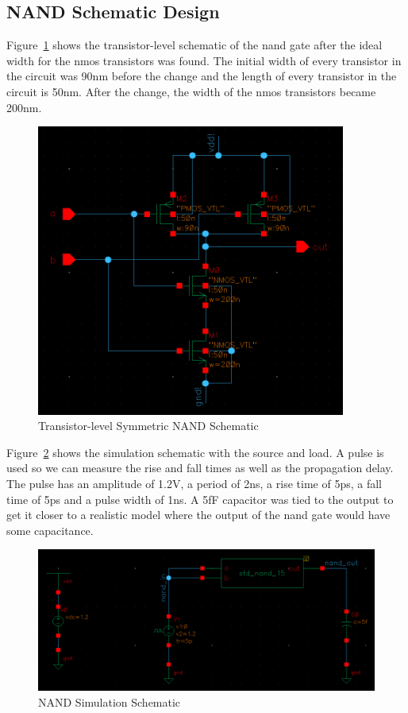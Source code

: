 \documentclass[12pt]{article}
\begin{document}
\subsection{NAND Schematic Design}
Figure~\ref{fig:nand_schem} shows the transistor-level schematic of the nand gate after the ideal width for the nmos transistors was found.
The initial width of every transistor in the circuit was 90nm before the change and the length of every transistor in the circuit is 50nm. After the change, the width of the nmos
transistors became 200nm.
\begin{figure}[!htb]
  \centering
  \includegraphics[width=4in]{figures/nand/nand_schem.png}
  \caption{Transistor-level Symmetric NAND Schematic}\label{fig:nand_schem}
\end{figure}
Figure~\ref{fig:nand_sim} shows the simulation schematic with the source and load. A pulse is used so we can measure the rise and fall times as well as the propagation delay. The
pulse has an amplitude of 1.2V, a period of 2ns, a rise time of 5ps, a fall time of 5ps and a pulse width of 1ns. A 5fF capacitor was tied to the output to get it closer to a
realistic model where the output of the nand gate would have some capacitance.
\begin{figure}[!htb]
  \centering
  \includegraphics[width=5in]{figures/nand/nand_sim.png}
  \caption{NAND Simulation Schematic}\label{fig:nand_sim}
\end{figure}
\end{document}
